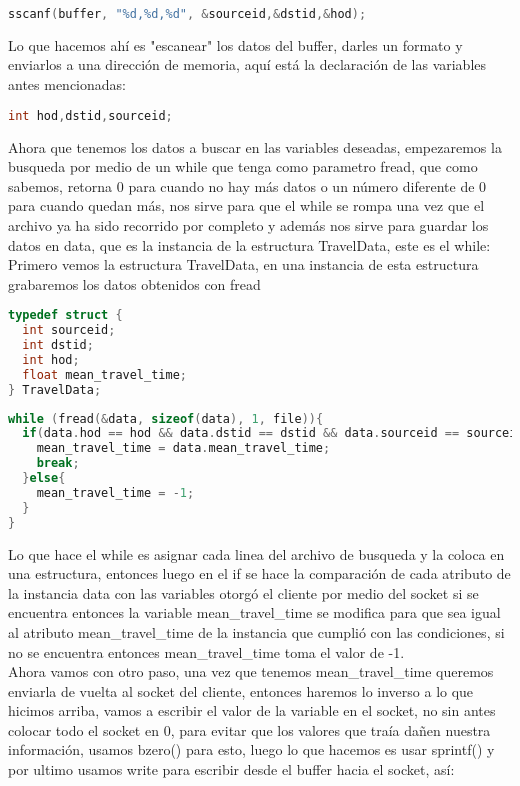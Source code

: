 \documentclass{article}
\begin{document}
\begin{lstlisting}[language=C]
sscanf(buffer, "%d,%d,%d", &sourceid,&dstid,&hod);
\end{lstlisting}

Lo que hacemos ahí es "escanear" los datos del buffer, darles un formato y enviarlos a una dirección de memoria, aquí está la declaración de las variables antes mencionadas:

\begin{lstlisting}[language=C]
int hod,dstid,sourceid;
\end{lstlisting}

Ahora que tenemos los datos a buscar en las variables deseadas, empezaremos la busqueda por medio de un while que tenga como parametro fread\cite{man7fread}, que como sabemos, retorna 0 para cuando no hay más datos o un número diferente de 0 para cuando quedan más, nos sirve para que el while se rompa una vez que el archivo ya ha sido recorrido por completo y además nos sirve para guardar los datos en data, que es la instancia de la estructura TravelData, este es el while:
Primero vemos la estructura TravelData, en una instancia de esta estructura grabaremos los datos obtenidos con fread
\begin{lstlisting}[language=C]
typedef struct {
  int sourceid;
  int dstid;
  int hod;
  float mean_travel_time;
} TravelData;
\end{lstlisting}


\begin{lstlisting}[language=C]
while (fread(&data, sizeof(data), 1, file)){
  if(data.hod == hod && data.dstid == dstid && data.sourceid == sourceid ){
    mean_travel_time = data.mean_travel_time;
    break;
  }else{
    mean_travel_time = -1;
  }
}\end{lstlisting}

Lo que hace el while es asignar cada linea del archivo de busqueda y la coloca en una estructura, entonces luego en el if se hace la comparación de cada atributo de la instancia data con las variables otorgó el cliente por medio del socket si se encuentra entonces la variable mean\_travel\_time se modifica para que sea igual al atributo mean\_travel\_time de la instancia que cumplió con las condiciones, si no se encuentra entonces mean\_travel\_time toma el valor de -1.\\ 
Ahora vamos con otro paso, una vez que tenemos mean\_travel\_time queremos enviarla de vuelta al socket del cliente, entonces haremos lo inverso a lo que hicimos arriba, vamos a escribir el valor de la variable en el socket, no sin antes colocar todo el socket en 0, para evitar que los valores que traía dañen nuestra información, usamos bzero() para esto, luego lo que hacemos es usar sprintf()\cite{man7sprintf} y por ultimo usamos write para escribir desde el buffer hacia el socket, así:
\end{document}
